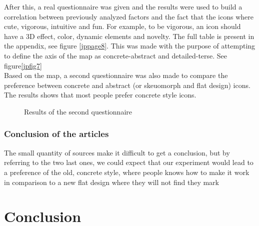 \documentclass[a4paper,11pt] {article}
\theoremstyle{definition}
\begin{document}
    After this, a real questionnaire was given and the results were used to build a correlation between previously analyzed factors and the fact that the icons where cute, vigorous, intuitive and fun. For example, to be vigorous, an icon should have a 3D effect, color, dynamic elements and novelty. The full table is present in the appendix, see figure \ref{jppage8}. This was made with the purpose of attempting to define the axis of the map as concrete-abstract and detailed-terse. See figure\ref{jpfig7}\\

    Based on the map, a second questionnaire was also made to compare the preference between concrete and abstract (or skeuomorph and flat design) icons. The results shows that most people prefer concrete style icons.

    \begin{figure}[H]
      \caption{Results of the second questionnaire}\label{jppage10}
    \end{figure}

    \subsubsection{Conclusion of the articles}
        The small quantity of sources make it difficult to get a conclusion, but by referring to the two last ones, we could expect that our experiment would lead to a preference of the old, concrete style, where people knows how to make it work in comparison to a new flat design where they will not find they mark

\section{Conclusion}
\end{document}
